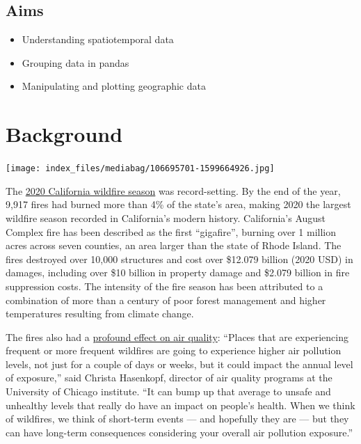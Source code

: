 \documentclass[
  letterpaper,
  DIV=11,
  numbers=noendperiod]{scrreprt}
\providecommand{\tightlist}{%
  \setlength{\itemsep}{0pt}\setlength{\parskip}{0pt}}\usepackage{longtable,booktabs,array}
\begin{document}
\hypertarget{aims-1}{%
\subsection{Aims}\label{aims-1}}

\begin{itemize}
\tightlist
\item
  Understanding spatiotemporal data
\item
  Grouping data in pandas
\item
  Manipulating and plotting geographic data
\end{itemize}

\hypertarget{background}{%
\section{Background}\label{background}}

\texttt{[image: index\_files/mediabag/106695701-1599664926.jpg]}

The \href{https://en.wikipedia.org/wiki/2020_California_wildfires}{2020
California wildfire season} was record-setting. By the end of the year,
9,917 fires had burned more than 4\% of the state's area, making 2020
the largest wildfire season recorded in California's modern history.
California's August Complex fire has been described as the first
``gigafire'', burning over 1 million acres across seven counties, an
area larger than the state of Rhode Island. The fires destroyed over
10,000 structures and cost over \$12.079 billion (2020 USD) in damages,
including over \$10 billion in property damage and \$2.079 billion in
fire suppression costs. The intensity of the fire season has been
attributed to a combination of more than a century of poor forest
management and higher temperatures resulting from climate change.

The fires also had a
\href{https://epic.uchicago.edu/news/pollution-from-californias-2020-wildfires-likely-offset-decades-of-air-quality-gains/}{profound
effect on air quality}: ``Places that are experiencing frequent or more
frequent wildfires are going to experience higher air pollution levels,
not just for a couple of days or weeks, but it could impact the annual
level of exposure,'' said Christa Hasenkopf, director of air quality
programs at the University of Chicago institute. ``It can bump up that
average to unsafe and unhealthy levels that really do have an impact on
people's health. When we think of wildfires, we think of short-term
events --- and hopefully they are --- but they can have long-term
consequences considering your overall air pollution exposure.''
\end{document}
